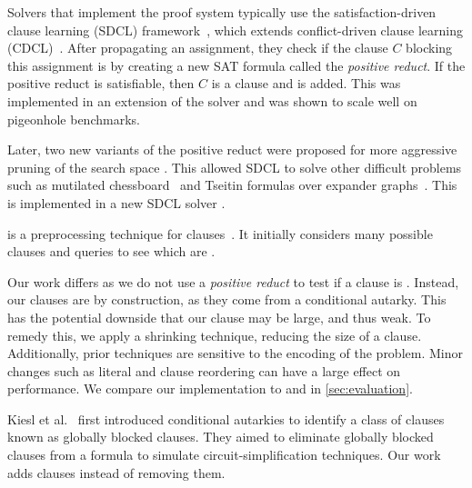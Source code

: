 


Solvers that implement the \pr proof system typically use the
satisfaction-driven clause learning (SDCL) framework~\cite{sdcl}, which extends
conflict-driven clause learning (CDCL)~\cite{sat-handbook}. 
After propagating an assignment, they check if the clause $C$ blocking this
assignment is \pr by creating a new SAT formula called the \emph{positive
reduct}. If the positive reduct is satisfiable, then $C$ is a \pr clause and is
added. This was implemented in an extension of the solver \lingeling and was
shown to scale well on pigeonhole benchmarks.

Later, two new variants of the positive reduct were proposed for more aggressive
pruning of the search space \cite{sadical}. This allowed SDCL to solve other
difficult problems such as mutilated chessboard~\cite{mutilatedchessboard-pr} and
 Tseitin formulas over expander graphs~\cite{hardexamplesresolution}. This
is implemented in a new SDCL solver \sadical.


\prelearn is a preprocessing technique for \pr clauses~\cite{prelearn}. It
initially considers many possible clauses and queries \sadical to see which are
\pr.

Our work differs as we do not use a \emph{positive reduct} to test if a clause
is \pr. Instead, our clauses are \pr by construction, as they come from a
conditional autarky. This has the potential downside that our clause may be
large, and thus weak. To remedy this, we apply a shrinking technique, reducing
the size of a clause. Additionally, prior techniques are sensitive to the
encoding of the problem. Minor changes such as literal and clause reordering can
have a large effect on performance. We compare our
implementation \tool to \sadical and \prelearn in \autoref{sec:evaluation}.

Kiesl et al.~\cite{conditionalautarkies} first introduced conditional autarkies
to identify a class of \pr clauses known as globally blocked clauses. They aimed
to eliminate globally blocked clauses from a formula
to simulate circuit-simplification techniques. Our work adds clauses instead of removing them.

